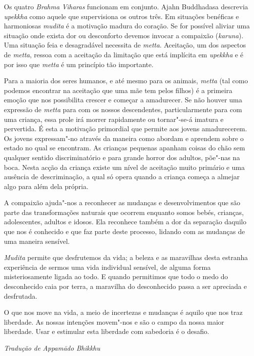 Os quatro \emph{Brahma Viharas} funcionam em conjunto. Ajahn Buddhadasa
descrevia \emph{upekkha} como aquele que supervisiona os outros três. Em
situações benéficas e harmoniosas \emph{mudita} é a motivação madura do
coração. Se for possível aliviar uma situação onde exista dor ou
desconforto devemos invocar a compaixão (\emph{karuna}). Uma situação
feia e desagradável necessita de \emph{metta}. Aceitação, um dos
aspectos de \emph{metta}, ressoa com a aceitação da limitação que está
implícita em \emph{upekkha} e é por isso que \emph{metta} é um princípio
tão importante.

Para a maioria dos seres humanos, e até mesmo para os animais,
\emph{metta} (tal como podemos encontrar na aceitação que uma mãe tem
pelos filhos) é a primeira emoção que nos possibilita crescer e começar
a amadurecer. Se não houver uma expressão de \emph{metta} para com os
nossos descendentes, particularmente para com uma criança, essa prole
irá morrer rapidamente ou tornar"-se-á imatura e pervertida. É esta a
motivação primordial que permite aos jovens amadurecerem. Os jovens
expressam"-no através da maneira como abordam e aprendem sobre o estado
no qual se encontram. As crianças pequenas apanham coisas do chão sem
qualquer sentido discriminatório e para grande horror dos adultos,
põe"-nas na boca. Nesta acção da criança existe um nível de aceitação
muito primário e uma ausência de descriminação, a qual só opera quando a
criança começa a almejar algo para além dela própria.

A compaixão ajuda"-nos a reconhecer as mudanças e desenvolvimentos que
são parte das transformações naturais que ocorrem enquanto somos bebés,
crianças, adolescentes, adultos e idosos. Ela reconhece também a dor da
separação daquilo que nos é conhecido e que faz parte deste processo,
lidando com as mudanças de uma maneira sensível.

\emph{Mudita} permite que desfrutemos da vida; a beleza e as maravilhas
desta estranha experiência de sermos uma vida individual sensível, de
alguma forma misteriosamente ligada ao todo. E quando permitimos que
todo o medo do desconhecido caia por terra, a maravilha do desconhecido
passa a ser apreciada e desfrutada.

O que nos move na vida, a meio de incertezas e mudanças é aquilo que nos
traz liberdade. As nossas intenções movem"-nos e são o campo da nossa
maior liberdade. Usar e estimular esta liberdade com sabedoria é o
desafio.

\vfill
{\raggedleft\itshape\small
  Tradução de Appamādo Bhikkhu
\par}